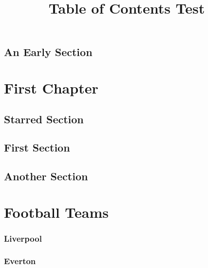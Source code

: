 \documentclass{book}
\title{Table of Contents Test}
\begin{document}
\tableofcontents

\section{An Early Section}

\chapter{First Chapter}

\section*{Starred Section}

\section{First Section}

\section{Another Section}

\chapter{Football Teams}

\subsection{Liverpool}

\subsection{Everton}
\end{document}
